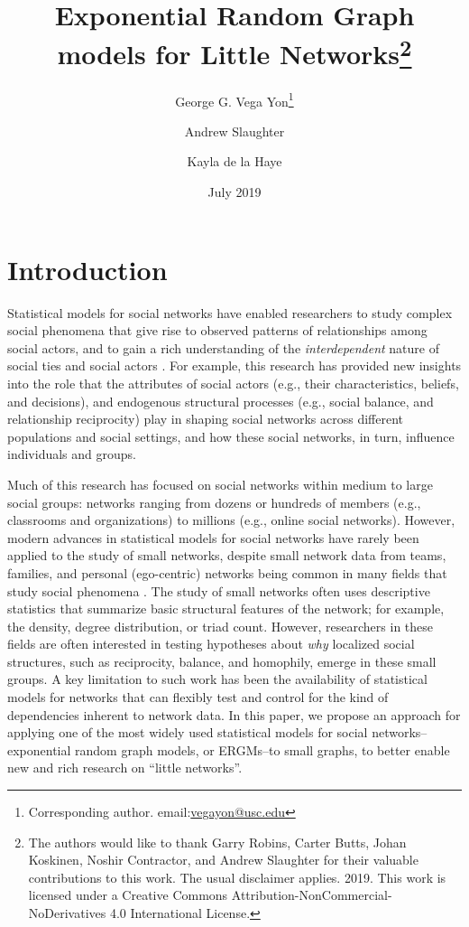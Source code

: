 \documentclass[12pt]{article}
\title{Exponential Random Graph models for Little Networks\footnote{The authors would like to thank Garry Robins, Carter Butts, Johan Koskinen, Noshir Contractor, and Andrew Slaughter for their valuable contributions to this work. The usual disclaimer applies.\textcopyright{} 2019. This work is licensed under a Creative Commons Attribution-NonCommercial-NoDerivatives 4.0 International License.}}
\author[1]{George G. Vega Yon\footnote{Corresponding author. email:\href{mailto:vegayon@usc.edu}{vegayon@usc.edu}}}
\author[2]{Andrew Slaughter}
\author[1]{Kayla de la Haye}
\affil[1]{University of Southern California, Department of Preventive Medicine}
\affil[2]{U.S. Army Research Institute for the Behavioral and Social Sciences}
\date{July 2019}
\begin{document}
\maketitle


\section{Introduction}

Statistical models for social networks have enabled researchers to study complex social phenomena that give rise to observed patterns of relationships among social actors, and to gain a rich understanding of the \textit{interdependent} nature of social ties and social actors \cite{Snijders2011,lusher2012exponential}. For example, this research has provided new insights into the role that the attributes of social actors (e.g., their characteristics, beliefs, and decisions), and endogenous structural processes (e.g., social balance, and relationship reciprocity) play in shaping social networks across different populations and social settings, and how  these social networks, in turn, influence individuals and groups. 

Much of this research has focused on social networks within medium to large social groups: networks ranging from dozens or hundreds of members (e.g., classrooms and organizations) to millions (e.g., online social networks). However, modern advances in statistical models for social networks have rarely been applied to the study of small networks, despite small network data from teams, families, and personal (ego-centric) networks being common in many fields that study social phenomena \cite{HENTTONEN201074, CarterDR2015, bott2001family,crossley2015social}. The study of small networks often uses descriptive statistics that summarize basic structural features of the network; for example, the density, degree distribution, or triad count. However, researchers in these fields are often interested in testing hypotheses about \textit{why} localized social structures, such as reciprocity, balance, and homophily, emerge in these small groups. A key limitation to such work has been the availability of statistical models for networks that can flexibly test and control for the kind of dependencies inherent to network data. In this paper, we propose an approach for applying one of the most widely used statistical models for social networks--exponential random graph models, or ERGMs--to small graphs, to better enable new and rich research on ``little networks''. 
\end{document}
